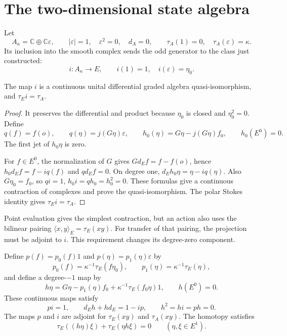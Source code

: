 \section{The two-dimensional state algebra}

Let
\begin{equation}\label{mht:eq:residual-algebra}
 A_\kappa=\mathbb C\oplus\mathbb C\varepsilon,\qquad
 |\varepsilon|=1,\quad \varepsilon^2=0,\quad d_A=0,\qquad
 \tau_A(1)=0,\quad\tau_A(\varepsilon)=\kappa.
\end{equation}
Its inclusion into the smooth complex sends the odd generator to the
class just constructed:
\[
 i:A_\kappa\longrightarrow E,\qquad i(1)=1,\quad i(\varepsilon)=\eta_0.
\]

\begin{proposition}\label{mht:prop:polar-model}
The map $i$ is a continuous unital differential graded algebra
quasi-isomorphism, and $\tau_Ei=\tau_A$.
\end{proposition}

\begin{proof}
It preserves the differential and product because $\eta_0$ is closed
and $\eta_0^2=0$. Define
\[
 q(f)=f(o),\qquad q(\eta)=j(G\eta)\varepsilon,\qquad
 h_0(\eta)=G\eta-j(G\eta)f_0,\qquad h_0(E^0)=0.
\]
The first jet of $h_0\eta$ is zero.

For $f\in E^0$, the normalization
of $G$ gives $Gd_Ef=f-f(o)$, hence
$h_0d_Ef=f-iq(f)$ and $qd_Ef=0$. On degree one,
$d_Eh_0\eta=\eta-iq(\eta)$. Also $G\eta_0=f_0$, so
$qi=1$, $h_0i=qh_0=h_0^2=0$. These formulas give a continuous
contraction of complexes and prove the quasi-isomorphism.
The polar Stokes identity gives $\tau_Ei=\tau_A$.
\end{proof}

Point evaluation gives the simplest contraction, but an action also
uses the bilinear pairing $\langle x,y\rangle_E=\tau_E(xy)$.
For transfer of that pairing, the projection must be adjoint to $i$.
This requirement changes its degree-zero component.

\begin{theorem}\label{mht:thm:cyclic-contraction}
Define $p(f)=p_0(f)1$ and $p(\eta)=p_1(\eta)\varepsilon$ by
\begin{equation}\label{mht:eq:adjoint-projection}
 p_0(f)=\kappa^{-1}\tau_E(f\eta_0),\qquad
 p_1(\eta)=\kappa^{-1}\tau_E(\eta),
\end{equation}
and define a degree-$-1$ map by
\begin{equation}\label{mht:eq:cyclic-homotopy}
 h\eta=G\eta-p_1(\eta)f_0+\kappa^{-1}\tau_E(f_0\eta)1,
 \qquad h(E^0)=0.
\end{equation}
These continuous maps satisfy
\begin{equation}\label{mht:eq:contraction-identities}
 pi=1,\qquad d_Eh+hd_E=1-ip,\qquad h^2=hi=ph=0.
\end{equation}
The maps $p$ and $i$ are adjoint for $\tau_E(xy)$ and $\tau_A(xy)$.
The homotopy satisfies
\begin{equation}\label{mht:eq:cyclicity}
 \tau_E((h\eta)\xi)+\tau_E(\eta h\xi)=0
 \qquad(\eta,\xi\in E^1).
\end{equation}
\end{theorem}

